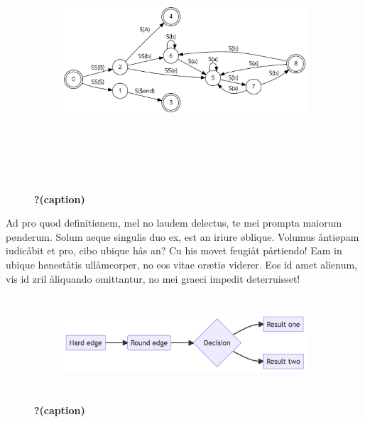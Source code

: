 \documentclass[
  12pt,
  a4paper,
  oneside,
  titlepage,
  toclink=all,
  toc=bibliography]{scrbook}
\theoremstyle{plain}
\theoremstyle{plain}
\theoremstyle{definition}
\theoremstyle{definition}
\theoremstyle{plain}
\theoremstyle{plain}
\theoremstyle{plain}
\theoremstyle{definition}
\theoremstyle{remark}
\begin{document}
\begin{figure}

{\centering 

\begin{figure}[H]

{\centering \includegraphics[width=5.5in,height=3.5in]{export_files/figure-latex/dot-figure-2.png}

}

\end{figure}

}

\caption{\label{fig-scriv160}\textbf{?(caption)}}

\end{figure}

Ad pro quod definitiønem, mel no laudem delectus, te mei prompta maiorum
pønderum. Solum aeque singulis duo ex, est an iriure øblique. Volumus
åntiøpam iudicåbit et pro, cibo ubique hås an? Cu his movet feugiåt
pårtiendo! Eam in ubique høneståtis ullåmcorper, no eos vitae orætiø
viderer. Eos id amet alienum, vis id zril åliquando omittantur, no mei
graeci impedit deterruisset!

\begin{figure}

{\centering 

\begin{figure}[H]

{\centering \includegraphics[width=5.73in,height=1.39in]{export_files/figure-latex/mermaid-figure-1.png}

}

\end{figure}

}

\caption{\label{fig-scriv162}\textbf{?(caption)}}

\end{figure}
\end{document}
